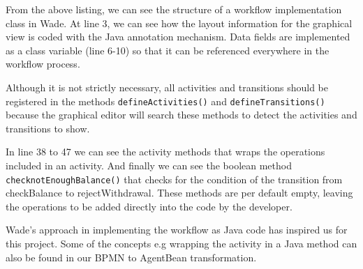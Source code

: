 From the above listing, we can see the structure of a workflow implementation class in Wade. At line 3, we can see how the layout information for the graphical view is coded with the Java annotation mechanism. Data fields are implemented as a class variable (line 6-10) so that it can be referenced everywhere in the workflow process. 

Although it is not strictly necessary, all activities and transitions should be registered in the methods \verb|defineActivities()| and \verb|defineTransitions()| because the graphical editor will search these methods to detect the activities and transitions to show.

In line 38 to 47 we can see the activity methods that wraps the operations included in an activity. And finally we can see the boolean method  \verb|checknotEnoughBalance()| that checks for the condition of the transition from checkBalance to rejectWithdrawal. These methods are per default empty, leaving the operations to be added directly into the code by the developer.

Wade's approach in implementing the workflow as Java code has inspired us for this project. Some of the concepts e.g wrapping the activity in a Java method can also be found in our BPMN to AgentBean transformation. 